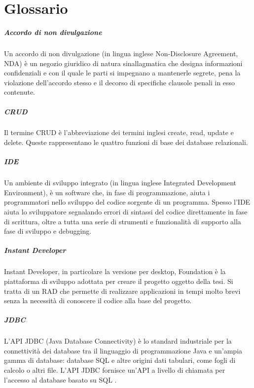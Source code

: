 \chapter{Glossario}

\paragraph{Accordo di non divulgazione}
\label{NDA}
Un accordo di non divulgazione (in lingua inglese Non-Disclosure Agreement, NDA) è un negozio giuridico di natura sinallagmatica che designa informazioni confidenziali e con il quale le parti si impegnano a mantenerle segrete, pena la violazione dell'accordo stesso e il decorso di specifiche clausole penali in esso contenute. \hyperref[bib13]{\cite{[13]}}

\paragraph{CRUD}
\label{CRUD}
Il termine CRUD è l'abbreviazione dei termini inglesi create, read, update e delete. Queste rappresentano le quattro funzioni di base dei database relazionali.

\paragraph{IDE}
\label{IDE}
Un ambiente di sviluppo integrato (in lingua inglese Integrated Development Environment), è un software che, in fase di programmazione, aiuta i programmatori nello sviluppo del codice sorgente di un programma. 
Spesso l'IDE aiuta lo sviluppatore segnalando errori di sintassi del codice direttamente in fase di scrittura, oltre a tutta una serie di strumenti e funzionalità di supporto alla fase di sviluppo e debugging. \hyperref[bib11]{\cite{[16]}}

\paragraph{Instant Developer}
\label{InDe}
Instant Developer, in particolare la versione per desktop, Foundation è la piattaforma di sviluppo adottata per creare il progetto oggetto della tesi. Si tratta di un RAD che permette di realizzare applicazioni in tempi molto brevi senza la necessità di conoscere il codice alla base del progetto.

\paragraph{JDBC}
\label{JDBC}
L'API JDBC (Java Database Connectivity) è lo standard industriale per la connettività dei database tra il linguaggio di programmazione Java e un'ampia gamma di database: database SQL e altre origini dati tabulari, come fogli di calcolo o altri file. L'API JDBC fornisce un'API a livello di chiamata per l'accesso al database basato su SQL \cite{[26]}.

